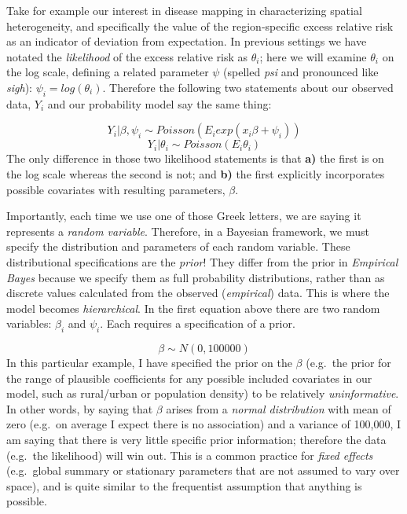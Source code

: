 \documentclass[
]{book}
\begin{document}
Take for example our interest in disease mapping in characterizing spatial heterogeneity, and specifically the value of the region-specific excess relative risk as an indicator of deviation from expectation. In previous settings we have notated the \emph{likelihood} of the excess relative risk as \(\theta_i\); here we will examine \(\theta_i\) on the log scale, defining a related parameter \(\psi\) (spelled \emph{psi} and pronounced like \emph{sigh}): \(\psi_i = log(\theta_i)\). Therefore the following two statements about our observed data, \(Y_i\) and our probability model say the same thing:

\[Y_i | \beta, \psi_i \sim Poisson(E_i exp(x_i \beta + \psi_i))\]
\[Y_i| \theta_i \sim Poisson(E_i \theta_i)\]
The only difference in those two likelihood statements is that \textbf{a)} the first is on the log scale whereas the second is not; and \textbf{b)} the first explicitly incorporates possible covariates with resulting parameters, \(\beta\).

Importantly, each time we use one of those Greek letters, we are saying it represents a \emph{random variable}. Therefore, in a Bayesian framework, we must specify the distribution and parameters of each random variable. These distributional specifications are the \emph{prior}! They differ from the prior in \emph{Empirical Bayes} because we specify them as full probability distributions, rather than as discrete values calculated from the observed (\emph{empirical}) data. This is where the model becomes \emph{hierarchical}. In the first equation above there are two random variables: \(\beta_i\) and \(\psi_i\). Each requires a specification of a prior.

\[\beta \sim N(0,100000)\]
In this particular example, I have specified the prior on the \(\beta\) (e.g.~the prior for the range of plausible coefficients for any possible included covariates in our model, such as rural/urban or population density) to be relatively \emph{uninformative}. In other words, by saying that \(\beta\) arises from a \emph{normal distribution} with mean of zero (e.g.~on average I expect there is no association) and a variance of 100,000, I am saying that there is very little specific prior information; therefore the data (e.g.~the likelihood) will win out. This is a common practice for \emph{fixed effects} (e.g.~global summary or stationary parameters that are not assumed to vary over space), and is quite similar to the frequentist assumption that anything is possible.
\end{document}
